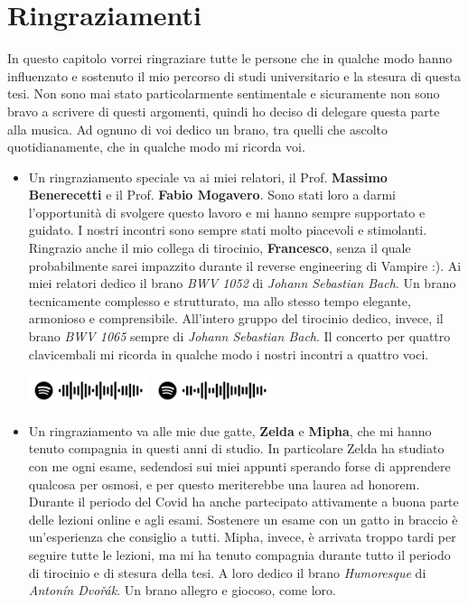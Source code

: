 \documentclass[./main.tex]{subfiles}
\begin{document}
\chapter*{Ringraziamenti}
In questo capitolo vorrei ringraziare tutte le persone che in qualche modo hanno influenzato 
e sostenuto il mio percorso di studi universitario e la stesura di questa tesi.
Non sono mai stato particolarmente sentimentale e sicuramente non sono bravo a scrivere di questi argomenti,
quindi ho deciso di delegare questa parte alla musica. 
Ad ognuno di voi dedico un brano, tra quelli che ascolto quotidianamente, che in qualche modo mi ricorda voi.

\begin{itemize}
    \item Un ringraziamento speciale va ai miei relatori, il Prof. \textbf{Massimo Benerecetti} e il Prof. \textbf{Fabio Mogavero}.
    Sono stati loro a darmi l'opportunità di svolgere questo lavoro e mi hanno sempre supportato e guidato.
    I nostri incontri sono sempre stati molto piacevoli e stimolanti.
    Ringrazio anche il mio collega di tirocinio, \textbf{Francesco}, 
    senza il quale probabilmente sarei impazzito durante il reverse engineering di Vampire :).
    Ai miei relatori dedico il brano \textit{BWV 1052} di \textit{Johann Sebastian Bach}. 
    Un brano tecnicamente complesso e strutturato, ma allo stesso tempo elegante, armonioso e comprensibile.
    All'intero gruppo del tirocinio dedico, invece, il brano \textit{BWV 1065} sempre di \textit{Johann Sebastian Bach}.
    Il concerto per quattro clavicembali mi ricorda in qualche modo i nostri incontri a quattro voci.

    \includegraphics[width=3.5cm]{images/7_ringraziamenti/professori.png}
    \includegraphics[width=3.5cm]{images/7_ringraziamenti/professori2.png}

    \item Un ringraziamento va alle mie due gatte, \textbf{Zelda} e \textbf{Mipha}, che mi hanno tenuto compagnia in questi anni di studio.
    In particolare Zelda ha studiato con me ogni esame, 
    sedendosi sui miei appunti sperando forse di apprendere qualcosa per osmosi,
    e per questo meriterebbe una laurea ad honorem.
    Durante il periodo del Covid ha anche partecipato attivamente a buona parte delle lezioni online e agli esami.
    Sostenere un esame con un gatto in braccio è un'esperienza che consiglio a tutti.
    Mipha, invece, è arrivata troppo tardi per seguire tutte le lezioni, 
    ma mi ha tenuto compagnia durante tutto il periodo di tirocinio e di stesura della tesi.
    A loro dedico il brano \textit{Humoresque} di \textit{Antonín Dvořák}.
    Un brano allegro e giocoso, come loro.


\end{itemize}
\end{document}
